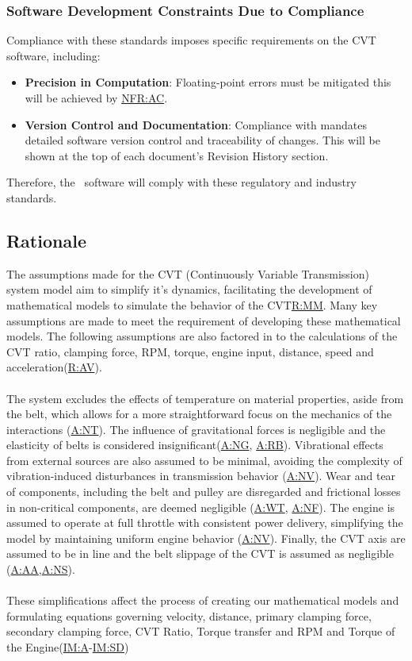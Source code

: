 \documentclass[12pt]{article}
\newcommand{\hpref}[1]{\hyperref[#1]{#1}}
\begin{document}
\subsubsection{Software Development Constraints Due to Compliance}
Compliance with these standards imposes specific requirements on the CVT software, including:
\begin{itemize}
    \item \textbf{Precision in Computation}: Floating-point errors must be mitigated this will be achieved by \hpref{NFR:AC}.
    \item \textbf{Version Control and Documentation}: Compliance with \cite{ISO26262Standard} mandates detailed software version control and traceability of changes. This will be shown at the top of each document's Revision History section. 
\end{itemize}

\noindent Therefore, the \progname \ software will comply with these regulatory and industry standards.


\subsection{Rationale}

The assumptions made for the CVT (Continuously Variable Transmission) system model aim to simplify it's dynamics, facilitating the development of mathematical models to simulate the behavior of the CVT{\hpref{R:MM}}. 
Many key assumptions are made to meet the requirement of developing these mathematical models. The following assumptions are also factored in to the calculations of the CVT ratio, clamping force, RPM, torque, engine input, distance, speed and acceleration(\hpref{R:AV}). 
\\\\
\noindent The system excludes the effects of temperature on material properties, aside from the belt, which allows for a more straightforward focus on the mechanics of the interactions (\hpref{A:NT}).
The influence of gravitational forces is negligible and the elasticity of belts is considered insignificant(\hpref{A:NG}, \hpref{A:RB}). 
Vibrational effects from external sources are also assumed to be minimal, avoiding the complexity of vibration-induced disturbances in transmission behavior (\hpref{A:NV}).
Wear and tear of components, including the belt and pulley are disregarded and frictional losses in non-critical components, are deemed negligible (\hpref{A:WT}, \hpref{A:NF}). 
The engine is assumed to operate at full throttle with consistent power delivery, simplifying the model by maintaining uniform engine behavior (\hpref{A:NV}).
Finally, the CVT axis are assumed to be in line and the belt slippage of the CVT is assumed as negligible (\hpref{A:AA},\hpref{A:NS}). 
\\\\
\noindent These simplifications affect the process of creating our mathematical models and formulating equations governing velocity, distance, primary clamping force, secondary clamping force, CVT Ratio, Torque transfer and RPM and Torque of the Engine(\hpref{IM:A}-\hpref{IM:SD})
\end{document}
